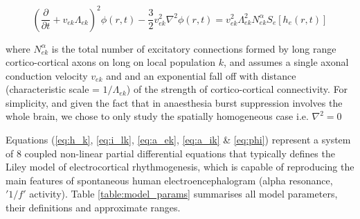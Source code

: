\documentclass[a4paper,12pt]{article}
\begin{document}
\begin{equation} \label{eq:phi}
\left(\frac{\partial}{\partial t} + v_{ek} \Lambda_{ek} \right)^2 \phi(r,t) - \frac{3}{2} v_{ek}^2
\nabla^2\phi(r,t)=v_{ek}^2 \Lambda_{ek}^2 N_{ek}^\alpha S_e[h_e(r,t)]
\end{equation}

where $N_{ek}^\alpha$ is the total number of excitatory connections formed by
long range cortico-cortical axons on long on local population $k$, and
assumes a single axonal conduction velocity $v_{ek}$ and and an exponential fall
off with distance (characteristic scale = $1/\Lambda_{ek}$) of the strength of
cortico-cortical connectivity. For simplicity, and given the fact that in
anaesthesia burst suppression involves the whole brain, we chose to
only study the spatially homogeneous case i.e. $\nabla^2 = 0$

Equations (\ref{eq:h_k}, \ref{eq:i_lk}, \ref{eq:a_ek}, \ref{eq:a_ik} \& \ref{eq:phi}) represent a system of 8 coupled
non-linear partial
differential equations that typically defines the Liley model of
electrocortical rhythmogenesis, which is capable of reproducing the
main features of spontaneous human electroencephalogram (alpha
resonance, $'1/f'$ activity). Table \ref{table:model_params} summarises all model parameters,
their definitions and approximate ranges. 
\end{document}
